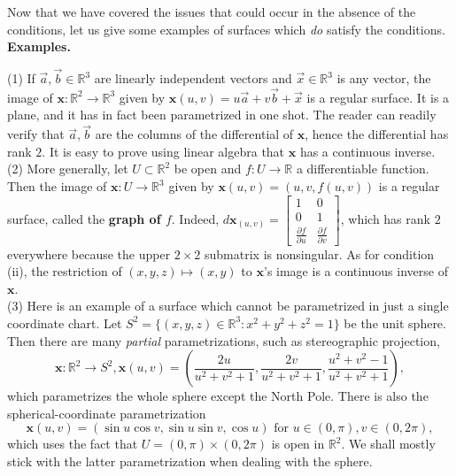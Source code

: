 \documentclass[leqno]{book}
\begin{document}
Now that we have covered the issues that could occur in the absence of the conditions, let us give some examples of surfaces which \emph{do} satisfy the conditions.\\

\noindent\textbf{Examples.}

(1) If $\vec a,\vec b\in\mathbb R^3$ are linearly independent vectors and $\vec x\in\mathbb R^3$ is any vector, the image of $\mathbf x:\mathbb R^2\to\mathbb R^3$ given by $\mathbf x(u,v)=u\vec a+v\vec b+\vec x$ is a regular surface.  It is a plane, and it has in fact been parametrized in one shot.  The reader can readily verify that $\vec a,\vec b$ are the columns of the differential of $\mathbf x$, hence the differential has rank $2$.  It is easy to prove using linear algebra that $\mathbf x$ has a continuous inverse.\\

(2) More generally, let $U\subset\mathbb R^2$ be open and $f:U\to\mathbb R$ a differentiable function.  Then the image of $\mathbf x:U\to\mathbb R^3$ given by $\mathbf x(u,v)=(u,v,f(u,v))$ is a regular surface, called the \textbf{graph of $f$}.  Indeed, $d\mathbf x_{(u,v)}=\begin{bmatrix}1&0\\0&1\\\frac{\partial f}{\partial u}&\frac{\partial f}{\partial v}\end{bmatrix}$, which has rank $2$ everywhere because the upper $2\times 2$ submatrix is nonsingular.  As for condition (ii), the restriction of $(x,y,z)\mapsto(x,y)$ to $\mathbf x$'s image is a continuous inverse of $\mathbf x$.\\

(3) Here is an example of a surface which cannot be parametrized in just a single coordinate chart.  Let $S^2=\{(x,y,z)\in\mathbb R^3:x^2+y^2+z^2=1\}$ be the unit sphere.  Then there are many \emph{partial} parametrizations, such as stereographic projection,
$$\mathbf x:\mathbb R^2\to S^2,\mathbf x(u,v)=\left(\frac{2u}{u^2+v^2+1},\frac{2v}{u^2+v^2+1},\frac{u^2+v^2-1}{u^2+v^2+1}\right),$$
which parametrizes the whole sphere except the North Pole.
There is also the spherical-coordinate parametrization
$$\mathbf x(u,v)=\left(\sin u\cos v,\sin u\sin v,\cos u\right)\text{ for }u\in(0,\pi),v\in(0,2\pi),$$
which uses the fact that $U=(0,\pi)\times(0,2\pi)$ is open in $\mathbb R^2$.  We shall mostly stick with the latter parametrization when dealing with the sphere.
\end{document}
